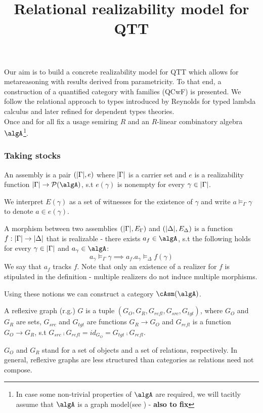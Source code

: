 \documentclass[12pt,a4paper]{article}
\title{\vspace{-5em} Relational realizability model for QTT}
\date{\vspace{-3em}}
\def\src{_{src}}\alwaysmath{src}
\def\rfl{_{refl}}\alwaysmath{rfl}
\def\tgt{_{tgt}}\alwaysmath{tgt}
\renewcommand{\O}{_{O}}\alwaysmath{O}
\def\R{_{R}}\alwaysmath{R}
\begin{document}
\maketitle
Our aim is to build a concrete realizability model for QTT which allows for metareasoning with results derived from parametricity. To that end, a construction of a quantified category with families (QCwF\cite{fill}) is presented. We follow the relational approach to types introduced by Reynolds for typed lambda calculus\cite{fill} and later refined for dependent types theories.\cite{fill}\\
Once and for all fix a usage semiring $R$ and an $R$-linear combinatory algebra $\algA$\footnote{In case some non-trivial properties of $\algA$ are required, we will tacitly assume that $\algA$ is a graph model(see \cite{fill}) - \textbf{also to fix}}.

\subsubsection*{Taking stocks}
\begin{definition}[Assembly]
  An assembly \Gamma is a pair $(|\Gamma|, e)$ where $|\Gamma|$ is a carrier set and  $e$ is a realizability function $\carr\Gamma \to \pow(\algA)$, s.t $e(\gamma)$ is nonempty for every $\gamma \in |\Gamma|$.
\end{definition}
We interpret $E(\gamma)$ as a set of witnesses for the existence of $\gamma$ and write $a \vDash_\Gamma \gamma$ to denote $a \in e(\gamma)$.

A morphism between two assemblies $(|\Gamma|, E_\Gamma)$ and $(|\Delta|, E_\Delta)$ is a function $f : |\Gamma| \to |\Delta|$ that is realizable - there exists $a_f \in \algA$, s.t the following holds for every $\gamma \in |\Gamma|$ and $a_\gamma \in \algA$:
$$ a_\gamma \vDash_\Gamma \gamma \implies a_f . a_\gamma \vDash_\Delta f(\gamma) $$
We say that $a_f$ tracks $f$. Note that only an existence of a realizer for $f$ is stipulated in the definition - multiple realizers do not induce multiple morphisms.

Using these notions we can construct a category $\cAsm(\algA)$.

\begin{definition}
  \label{def:refl-graph}
  A reflexive graph (r.g.) $G$ is a tuple $(G\O, G\R, G\rfl, G\src, G\tgt)$, where $G_O$ and $G_R$ are sets, $G\src$ and $G\tgt$ are functions $G\R \to G\O$ and $G\rfl$ is a function $G\O \to G\R$, s.t $G\src \comp G\rfl = id_{G\O} = G\tgt \comp G\rfl$.
\end{definition}
$G\O$ and $G\R$ stand for a set of objects and a set of relations, respectively. In general, reflexive graphs are less structured than categories as relations need not compose. \\
\end{document}
